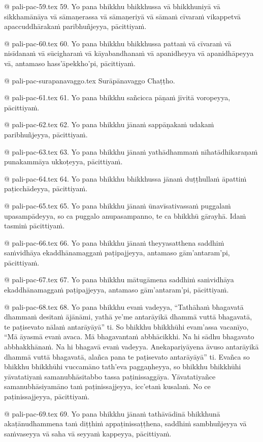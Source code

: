 @ pali-pac-59.tex
59. Yo pana bhikkhu bhikkhussa vā bhikkhuniyā vā sikkhamānāya vā sāmaṇerassa vā sāmaṇeriyā vā sāmaṁ cīvaraṁ vikappetvā apaccuddhārakaṁ paribhuñjeyya, pācittiyaṁ.

@ pali-pac-60.tex
60. Yo pana bhikkhu bhikkhussa pattaṁ vā cīvaraṁ vā nisīdanaṁ vā sūcigharaṁ vā kāyabandhanaṁ vā apanidheyya vā apanidhāpeyya vā, antamaso hass’āpekkho’pi, pācittiyaṁ.

@ pali-pac-surapanavaggo.tex
Surāpānavaggo Chaṭṭho.

@ pali-pac-61.tex
61. Yo pana bhikkhu sañcicca pāṇaṁ jīvitā voropeyya, pācittiyaṁ.

@ pali-pac-62.tex
62. Yo pana bhikkhu jānaṁ sappāṇakaṁ udakaṁ paribhuñjeyya,
pācittiyaṁ.

@ pali-pac-63.tex
63. Yo pana bhikkhu jānaṁ yathādhammaṁ nīhatādhikaraṇaṁ punakammāya ukkoṭeyya, pācittiyaṁ.

@ pali-pac-64.tex
64. Yo pana bhikkhu bhikkhussa jānaṁ duṭṭhullaṁ āpattiṁ paṭicchādeyya, pācittiyaṁ.

@ pali-pac-65.tex
65. Yo pana bhikkhu jānaṁ ūnavīsativassaṁ puggalaṁ upasampādeyya, so ca puggalo anupasampanno, te ca bhikkhū gārayhā. Idaṁ tasmiṁ pācittiyaṁ.

@ pali-pac-66.tex
66. Yo pana bhikkhu jānaṁ theyyasatthena saddhiṁ saṁvidhāya ekaddhānamaggaṁ paṭipajjeyya, antamaso gām’antaram’pi, pācittiyaṁ.

@ pali-pac-67.tex
67. Yo pana bhikkhu mātugāmena saddhiṁ saṁvidhāya ekaddhānamaggaṁ paṭipajjeyya, antamaso gām’antaram’pi, pācittiyaṁ.

@ pali-pac-68.tex
68. Yo pana bhikkhu evaṁ vadeyya, “Tathāhaṁ bhagavatā dhammaṁ desitaṁ ājānāmi, yathā ye’me antarāyikā dhammā vuttā bhagavatā, te paṭisevato nālaṁ antarāyāyā” ti. So bhikkhu bhikkhūhi evam’assa vacanīyo, “Mā āyasmā evaṁ avaca. Mā bhagavantaṁ abbhācikkhi. Na hi sādhu bhagavato abbhakkhānaṁ. Na hi bhagavā evaṁ vadeyya. Anekapariyāyena āvuso antarāyikā dhammā vuttā bhagavatā, alañca pana te paṭisevato antarāyāyā” ti. Evañca so bhikkhu bhikkhūhi vuccamāno tath’eva paggaṇheyya, so bhikkhu bhikkhūhi yāvatatiyaṁ samanubhāsitabbo tassa paṭinissaggāya. Yāvatatiyañce samanubhāsiyamāno taṁ paṭinissajjeyya, icc’etaṁ kusalaṁ. No ce paṭinissajjeyya, pācittiyaṁ.

@ pali-pac-69.tex
69. Yo pana bhikkhu jānaṁ tathāvādinā bhikkhunā akaṭānudhammena taṁ diṭṭhiṁ appaṭinissaṭṭhena, saddhiṁ sambhuñjeyya vā saṁvaseyya vā saha vā seyyaṁ kappeyya, pācittiyaṁ.

